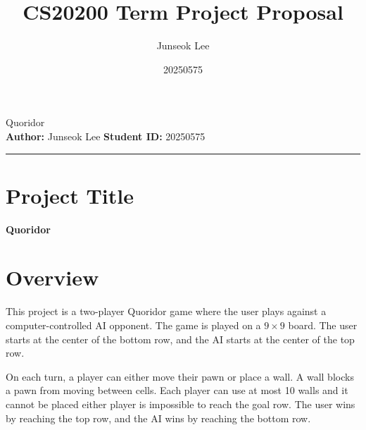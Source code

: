 \documentclass{article}
\title{CS20200 Term Project Proposal}
\author{Junseok Lee}
\date{20250575}
\begin{document}
\thispagestyle{fancy}
\begin{center}
    {\LARGE Quoridor}\\[1em]
    \textbf{Author:} Junseok Lee \quad
    \textbf{Student ID:} 20250575
\end{center}
\vspace{0.8em}
\hrule
\vspace{1.2em}
\section{Project Title}
{\large\bfseries Quoridor}

\section{Overview}
This project is a two-player Quoridor game where the user plays against a computer-controlled AI opponent.
The game is played on a $9\times 9$ board.
The user starts at the center of the bottom row, and the AI starts at the center of the top row.

On each turn, a player can either move their pawn or place a wall. A wall blocks a pawn from moving between cells.
Each player can use at most 10 walls and it cannot be placed either player is impossible to reach the goal row.
The user wins by reaching the top row, and the AI wins by reaching the bottom row.
\end{document}
